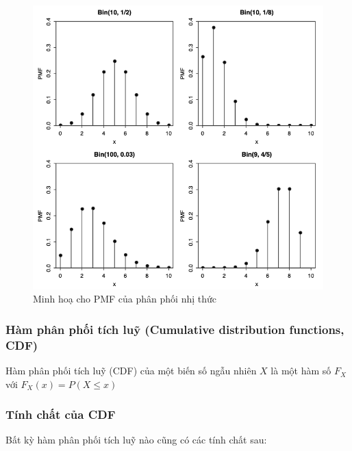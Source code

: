 \documentclass[
]{book}
\begin{document}
\begin{figure}

{\centering \includegraphics[width=1\linewidth]{figures/Picture09} 

}

\caption{Minh hoạ cho PMF của phân phối nhị thức}\label{fig:unnamed-chunk-7}
\end{figure}

\hypertarget{huxe0m-phuxe2n-phux1ed1i-tuxedch-luux1ef9-cumulative-distribution-functions-cdf}{%
\subsubsection{Hàm phân phối tích luỹ (Cumulative distribution functions, CDF)}\label{huxe0m-phuxe2n-phux1ed1i-tuxedch-luux1ef9-cumulative-distribution-functions-cdf}}

Hàm phân phối tích luỹ (CDF) của một biến số ngẫu nhiên \(X\) là một hàm số \(F_X\) với \(F_X(x) = P(X \leq x)\)

\hypertarget{tuxednh-chux1ea5t-cux1ee7a-cdf}{%
\subsubsection{Tính chất của CDF}\label{tuxednh-chux1ea5t-cux1ee7a-cdf}}

Bất kỳ hàm phân phối tích luỹ nào cũng có các tính chất sau:
\end{document}

